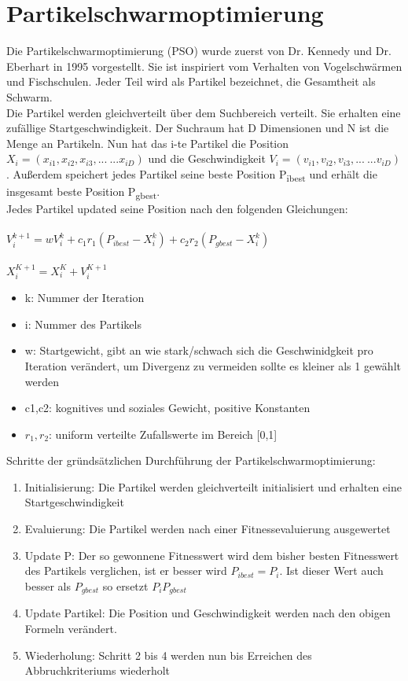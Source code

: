 \label{ch:algorithmen}
\section{Partikelschwarmoptimierung}
Die Partikelschwarmoptimierung (PSO) wurde zuerst von Dr. Kennedy und Dr. Eberhart in 1995 vorgestellt\cite{kennedy1942particle}.
Sie ist inspiriert vom Verhalten von Vogelschwärmen und Fischschulen. Jeder Teil wird als Partikel bezeichnet, die Gesamtheit als Schwarm.
\\ Die Partikel werden gleichverteilt über dem Suchbereich verteilt. Sie erhalten eine zufällige Startgeschwindigkeit. 
Der Suchraum hat D Dimensionen und N ist die Menge an Partikeln. Nun hat das i-te Partikel die Position $X_i=(x_{i1},x_{i2},x_{i3},...\ ...x_{iD})$
  und die Geschwindigkeit
  $V_{i}=(v_{i1},v_{i2},v_{i3},...\ ...v_{iD})$. Außerdem speichert jedes Partikel seine beste Position P\textsubscript{ibest} und erhält die insgesamt beste Position P\textsubscript{gbest}. 
\\
Jedes Partikel updated seine Position nach den folgenden Gleichungen:\\\\
\large $V_i^{k+1}=wV_i^k+c_1r_1(P_{ibest}-X_i^k)+c_2r_2(P_{gbest}-X_i^k)$
\\\\\normalsize
$X_i^{K+1}=X_i^K+V_i^{K+1}$
\begin{itemize}

  \item k: Nummer der Iteration
  \item i: Nummer des Partikels
  \item w: Startgewicht, gibt an wie stark/schwach sich die Geschwinidgkeit pro Iteration verändert, um Divergenz zu vermeiden sollte es  kleiner als 1 gewählt werden
  \item c1,c2: kognitives und soziales Gewicht, positive Konstanten
  \item $r_1,r_2$: uniform verteilte Zufallswerte im Bereich [0,1]

\end{itemize}
Schritte der gründsätzlichen Durchführung der Partikelschwarmoptimierung:
\begin{enumerate}
  \item Initialisierung: Die Partikel werden gleichverteilt initialisiert und erhalten eine Startgeschwindigkeit
  \item Evaluierung: Die Partikel werden nach einer Fitnessevaluierung ausgewertet 
  \item Update P: Der so gewonnene Fitnesswert wird dem bisher besten Fitnesswert des Partikels verglichen, ist er besser wird $P_{ibest}=P_i$. Ist dieser Wert auch besser als $P_{gbest}$ so ersetzt $P_i P_{gbest}$
  \item Update Partikel: Die Position und Geschwindigkeit werden nach den obigen Formeln verändert.
  \item Wiederholung: Schritt 2 bis 4 werden nun bis Erreichen des Abbruchkriteriums wiederholt
\end{enumerate}
